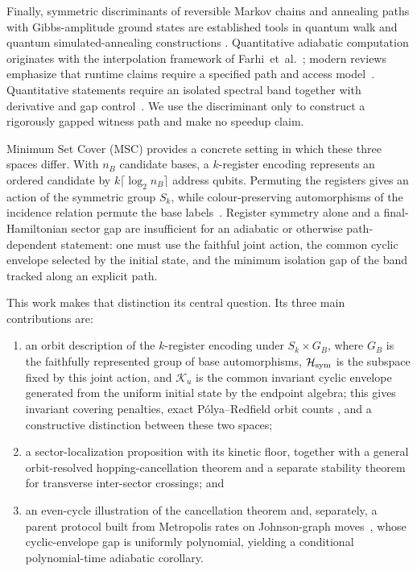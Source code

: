 Finally, symmetric discriminants of reversible Markov chains and annealing
paths with Gibbs-amplitude ground states are established tools in quantum
walk and quantum simulated-annealing constructions
\cite{Szegedy2004,SommaBoixoBarnumKnill2008}.  Quantitative adiabatic
computation originates with the interpolation framework of
Farhi~et~al.~\cite{Farhi2000}; modern reviews emphasize that runtime claims
require a specified path and access model~\cite{AlbashLidar2018}.
Quantitative statements require an isolated spectral band together with
derivative and gap control~\cite{JansenRuskaiSeiler2007}.  We use the discriminant only to
construct a rigorously gapped witness path and make no speedup claim.

Minimum Set Cover (MSC) provides a concrete setting in which these three
spaces differ.  With $n_B$ candidate bases, a $k$-register encoding
represents an ordered candidate by $k\lceil\log_2n_B\rceil$ address qubits.
Permuting the registers gives an action of the symmetric group $S_k$, while
colour-preserving automorphisms of the incidence relation permute the base
labels~\cite{McKayPiperno2014}.  Register symmetry alone and a
final-Hamiltonian sector gap are insufficient for an adiabatic or otherwise
path-dependent statement: one must use the faithful joint action, the common
cyclic envelope selected by the initial state, and the minimum isolation gap
of the band tracked along an explicit path.

This work makes that distinction its central question.  Its three main
contributions are:
\begin{enumerate}
\item an orbit description of the $k$-register encoding under
$S_k\times G_B$, where $G_B$ is the faithfully represented group of base
automorphisms, $\mathcal H_{\rm sym}$ is the subspace fixed by this joint
action, and $\mathcal K_u$ is the common invariant cyclic envelope generated
from the uniform initial state by the endpoint algebra; this gives invariant covering
penalties, exact P\'olya--Redfield orbit counts
\cite{Redfield1927,Polya1937}, and a constructive distinction between these
two spaces;
\item a sector-localization proposition with its kinetic floor, together
with a general orbit-resolved hopping-cancellation theorem and a separate
stability theorem for transverse inter-sector crossings; and
\item an even-cycle illustration of the cancellation theorem and,
separately, a parent protocol built from Metropolis rates on Johnson-graph
moves~\cite{Metropolis1953,BrouwerCohenNeumaier1989}, whose cyclic-envelope gap
is uniformly polynomial, yielding a conditional polynomial-time adiabatic
corollary.
\end{enumerate}

